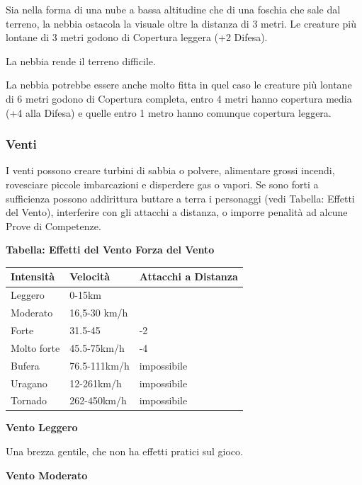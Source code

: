 \begin{multicols}{2}
\label{nebbia}

Sia nella forma di una nube a bassa altitudine che di una foschia che sale dal terreno, la nebbia ostacola la visuale oltre la distanza di 3 metri. Le creature più lontane di 3 metri godono di Copertura leggera (+2 Difesa).

La nebbia rende il terreno difficile.

La nebbia potrebbe essere anche molto fitta in quel caso le creature più lontane di 6 metri godono di Copertura completa, entro 4 metri hanno copertura media (+4 alla Difesa) e quelle entro 1 metro hanno comunque copertura leggera.

\subsubsection{Venti}

\label{venti}

I venti possono creare turbini di sabbia o polvere, alimentare grossi incendi, rovesciare piccole imbarcazioni e disperdere gas o vapori. Se sono forti a sufficienza possono addirittura buttare a terra i personaggi (vedi Tabella: Effetti del Vento), interferire con gli attacchi a distanza, o imporre penalità ad alcune Prove di Competenze.

\medskip

\textbf{Tabella: Effetti del Vento Forza del Vento}

\medskip

\begin{tabularx}{0.45\textwidth}{llX}
\textbf{Intensità} & \textbf{Velocità} & \textbf{Attacchi a Distanza} \\
\toprule
Leggero & 0-15km &\\
Moderato & 16,5-30 km/h& \\
Forte & 31.5-45 & -2 \\
Molto forte & 45.5-75km/h & -4 \\
Bufera & 76.5-111km/h & impossibile \\
Uragano & 12-261km/h & impossibile \\
Tornado & 262-450km/h & impossibile
\end{tabularx}

\bigskip

\textbf{Vento Leggero}

Una brezza gentile, che non ha effetti pratici sul gioco.

\textbf{Vento Moderato}


\end{multicols}

